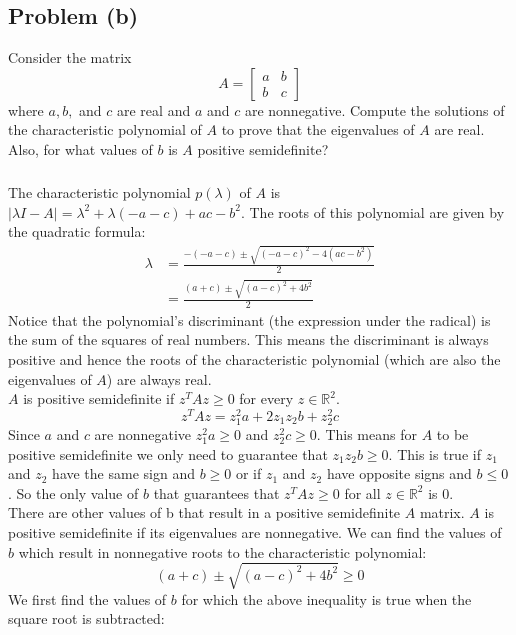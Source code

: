\documentclass[11pt]{article}
\begin{document}
\subsection*{Problem (b)}
Consider the matrix
\begin{equation*}
	A=\begin{bmatrix} a & b \\ b & c \end{bmatrix}
\end{equation*}
where $a,b,$ and $c$ are real and $a$ and $c$ are nonnegative. Compute the solutions of the characteristic polynomial of $A$ to prove that the eigenvalues of $A$ are real. Also, for what values of $b$ is $A$ positive semidefinite?
\subparagraph*{}
The characteristic polynomial $p(\lambda)$ of $A$ is $|\lambda I - A| = \lambda^2 + \lambda(-a-c) + ac - b^2$. The roots of this polynomial are given by the quadratic formula:
\begin{align*}
	\lambda &= \frac{-(-a-c)\pm\sqrt{(-a-c)^2-4(ac-b^2)}}{2} \\
	&= \frac{(a+c)\pm\sqrt{(a-c)^2+4b^2}}{2}
\end{align*}
Notice that the polynomial's discriminant (the expression under the radical) is the sum of the squares of real numbers. This means the discriminant is always positive and hence the roots of the characteristic polynomial (which are also the eigenvalues of $A$) are always real.\\
$A$ is positive semidefinite if $z^TAz \geq 0$ for every $z \in \mathbb{R}^2$. 
\begin{equation*}
	z^TAz=z_1^2a + 2z_1z_2b + z_2^2c
\end{equation*}
Since $a$ and $c$ are nonnegative $z_1^2a \geq 0$ and $z_2^2c \geq 0$. This means for $A$ to be positive semidefinite we only need to guarantee that $z_1z_2b \geq 0$. This is true if $z_1$ and $z_2$ have the same sign and $b \geq 0$ or if $z_1$ and $z_2$ have opposite signs and $b\leq0$. So the only value of $b$ that guarantees that $z^TAz\geq0$ for all $z\in\mathbb{R}^2$ is $0$. \\
There are other values of b that result in a positive semidefinite $A$ matrix. $A$ is positive semidefinite if its eigenvalues are nonnegative. We can find the values of $b$ which result in nonnegative roots to the characteristic polynomial:
\begin{equation*}
	(a+c)\pm\sqrt{(a-c)^2+4b^2} \geq 0
\end{equation*}
We first find the values of $b$ for which the above inequality is true when the square root is subtracted:
\end{document}
